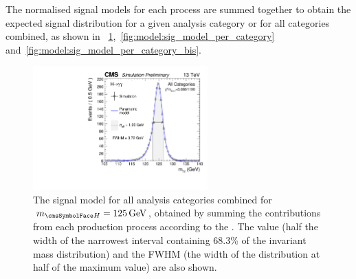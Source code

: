 The normalised signal models for each process are summed together to obtain the expected signal \mgg distribution for a given analysis category or for all categories combined, as shown in \Fig\s~\ref{fig:model:sig_model_all},~\ref{fig:model:sig_model_per_category} and~\ref{fig:model:sig_model_per_category_bis}.
\begin{figure}[ht!]
\centering
\includegraphics[width=0.6\textwidth]{modellingFigures/DCBpG/all.pdf} 

\caption{The signal model for all analysis categories combined for $\mH=125\GeV$, obtained by summing the contributions from each production process according to the \effxacc. The \effSigma value (half the width of the narrowest interval containing 68.3\% of the invariant mass distribution) and the FWHM (the width of the distribution at half of the maximum value) are also shown. }

\label{fig:model:sig_model_all}
\end{figure}

